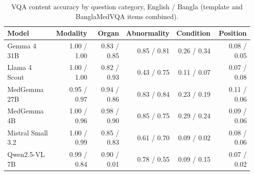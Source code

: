 \begin{table}[!htbp]
\centering
\small
\begin{tabular}{lrrrrr}
\toprule
Model & Modality & Organ & Abnormality & Condition & Position \\
\midrule
Gemma 4 31B & 1.00 / 1.00 & 0.83 / 0.85 & 0.85 / 0.81 & 0.26 / 0.34 & 0.08 / 0.05 \\
Llama 4 Scout & 1.00 / 1.00 & 0.82 / 0.93 & 0.43 / 0.75 & 0.11 / 0.07 & 0.07 / 0.08 \\
MedGemma 27B & 0.95 / 0.97 & 0.94 / 0.86 & 0.83 / 0.84 & 0.23 / 0.19 & 0.11 / 0.06 \\
MedGemma 4B & 1.00 / 0.96 & 0.98 / 0.90 & 0.85 / 0.75 & 0.29 / 0.24 & 0.09 / 0.06 \\
Mistral Small 3.2 & 1.00 / 0.99 & 0.85 / 0.83 & 0.61 / 0.70 & 0.09 / 0.02 & 0.08 / 0.06 \\
Qwen2.5-VL 7B & 0.99 / 0.84 & 0.90 / 0.01 & 0.78 / 0.55 & 0.09 / 0.15 & 0.07 / 0.02 \\
\bottomrule
\end{tabular}
\caption{VQA content accuracy by question category, English / Bangla (template and BanglaMedVQA items combined).}
\label{tab:vqacat}
\end{table}
